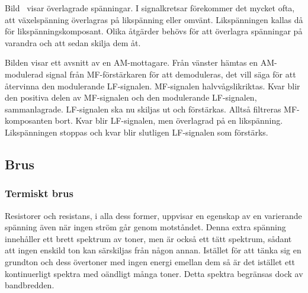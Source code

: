 Bild~ visar överlagrade spänningar.
I signalkretsar förekommer det mycket ofta, att växelspänning överlagras på
likspänning eller omvänt.
Likspänningen kallas då för likspänningskomposant.
Olika åtgärder behövs för att överlagra spänningar på varandra och att sedan
skilja dem åt.

Bilden visar ett avsnitt av en AM-mottagare.
Från vänster hämtas en AM-modulerad signal från MF-förstärkaren för att
demoduleras, det vill säga för att återvinna den modulerande LF-signalen.
MF-signalen halvvågslikriktas.
Kvar blir den positiva delen av MF-signalen och den modulerande LF-signalen,
sammanlagrade.
LF-signalen ska nu skiljas ut och förstärkas.
Alltså filtreras MF-komposanten bort.
Kvar blir LF-signalen, men överlagrad på en likspänning.
Likspänningen stoppas och kvar blir slutligen LF-signalen som förstärks.

\subsection{Brus}
\label{termisktbrus}

\subsubsection{Termiskt brus}

Resistorer och resistans, i alla dess former, uppvisar en egenskap av
en varierande spänning även när ingen ström går genom motståndet.
Denna extra spänning innehåller ett brett spektrum av toner, men är också ett
tätt spektrum, sådant att ingen enskild ton kan särskiljas från någon annan.
Istället för att tänka sig en grundton och dess övertoner med ingen energi
emellan dem så är det istället ett kontinuerligt spektra med oändligt många
toner.
Detta spektra begränsas dock av bandbredden.




